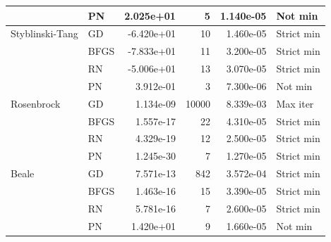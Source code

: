 \begin{table}[ht]
\begin{tabular}{llrrrl}
         & PN & 2.025e+01 & 5 & 1.140e-05 & Not min \\
        \hline
        Styblinski-Tang & GD & -6.420e+01 & 10 & 1.460e-05 & Strict min \\
         & BFGS & -7.833e+01 & 11 & 3.200e-05 & Strict min \\
         & RN & -5.006e+01 & 13 & 3.070e-05 & Strict min \\
         & PN & 3.912e-01 & 3 & 7.300e-06 & Not min \\
        \hline
        Rosenbrock & GD & 1.134e-09 & 10000 & 8.339e-03 & Max iter \\
         & BFGS & 1.557e-17 & 22 & 4.310e-05 & Strict min \\
         & RN & 4.329e-19 & 12 & 2.500e-05 & Strict min \\
         & PN & 1.245e-30 & 7 & 1.270e-05 & Strict min \\
        \hline
        Beale & GD & 7.571e-13 & 842 & 3.572e-04 & Strict min \\
         & BFGS & 1.463e-16 & 15 & 3.390e-05 & Strict min \\
         & RN & 5.781e-16 & 7 & 2.600e-05 & Strict min \\
         & PN & 1.420e+01 & 9 & 1.660e-05 & Not min \\
        \hline
    \end{tabular}
\end{table}
